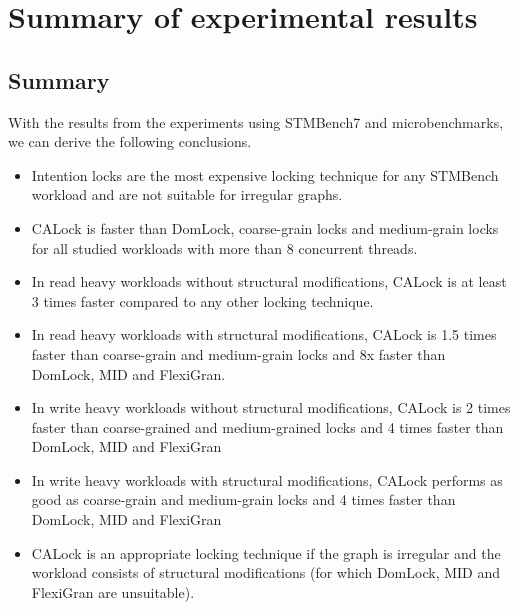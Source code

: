 \section{Summary of experimental results}


\subsection{Summary}
With the results from the experiments using STMBench7 and microbenchmarks, we can derive the following conclusions.
\begin{itemize}
	\item Intention locks are the most expensive locking technique for any STMBench workload and are not suitable for irregular graphs.
	\item CALock is faster than DomLock, coarse-grain locks and medium-grain locks for all studied workloads with more than 8 concurrent threads.

	\item In read heavy workloads without structural modifications, CALock is at least 3 times faster compared to any other locking technique.

	\item  In read heavy workloads with structural modifications, CALock is 1.5 times faster than coarse-grain and medium-grain locks and 8x faster than DomLock, MID and FlexiGran.

	\item In write heavy workloads without structural modifications, CALock is 2 times faster than coarse-grained and medium-grained locks and 4 times faster than DomLock, MID and FlexiGran

	\item In write heavy workloads with structural modifications, CALock performs as good as coarse-grain and medium-grain locks and 4 times faster than DomLock, MID and FlexiGran

	\item CALock is an appropriate locking technique if the graph is irregular and the workload consists of structural modifications (for which DomLock, MID and FlexiGran are unsuitable).
\end{itemize}
